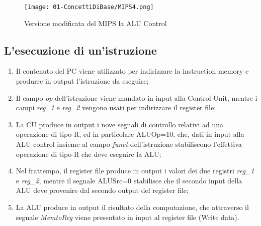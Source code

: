 


\begin{figure}[h]
    \centering
    \texttt{[image: 01-ConcettiDiBase/MIPS4.png]}
    \caption{Versione modificata del MIPS la ALU Control}
\end{figure}

\subsection{L'esecuzione di un'istruzione}

\begin{enumerate}
  \item Il contenuto del PC viene utilizzato per indirizzare la instruction memory e produrre in output l'istruzione da eseguire;
  \item Il campo \textit{op} dell’istruzione viene mandato in input alla Control
    Unit, mentre i campi \textit{reg\_1} e \textit{reg\_2} vengono usati per indirizzare il
register file;
\item La CU produce in output i nove segnali di controllo relativi ad una
operazione di tipo-R, ed in particolare ALUOp=10, che, dati in
input alla ALU control insieme al campo \textit{funct} dell’istruzione
stabiliscono l’effettiva operazione di tipo-R che deve eseguire la
ALU;
\item Nel frattempo, il register file produce in output i valori dei due
  registri \textit{reg\_1} e \textit{reg\_2}, mentre il segnale ALUSrc=0 stabilisce che il
secondo input della ALU deve provenire dal secondo output del
register file;
\item La ALU produce in output il risultato della computazione, che
  attraverso il segnale \textit{MemtoReg} viene presentato in input al register
file (Write data).
\end{enumerate}


